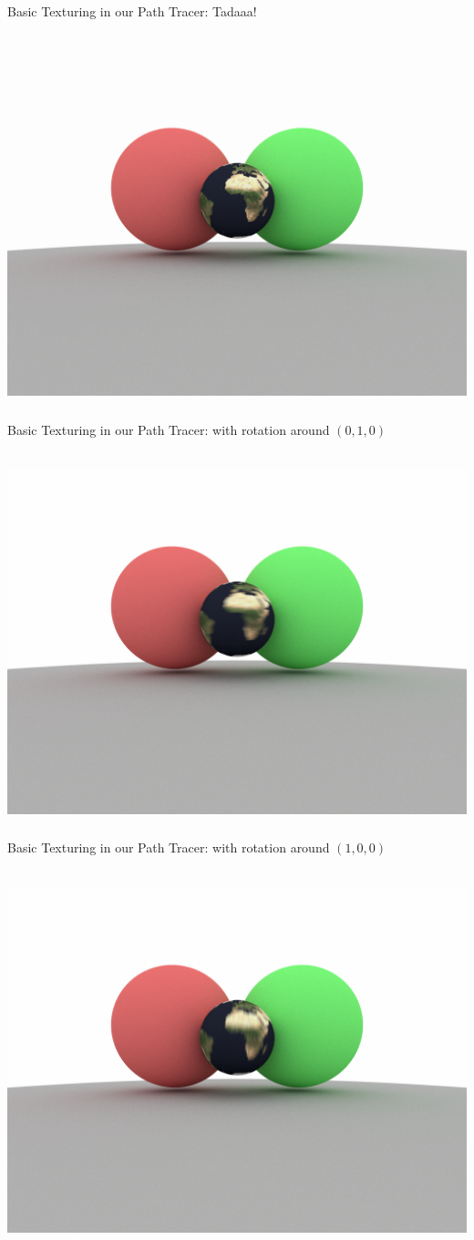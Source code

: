 \documentclass[utf8,stillsansserifmath,fleqn,t]{beamer}
\begin{document}
\begin{frame}[label=basic-tex-3]
\frametitle{\insertsection}
Basic Texturing in our Path Tracer: Tadaaa!\\~\\
\centerline{\includegraphics[width=.7\textwidth]{./fig/pathtracer-result-03.png}}
\end{frame}

\begin{frame}
\frametitle{\insertsection}
Basic Texturing in our Path Tracer:  with rotation around $(0,1,0)$\\~\\
\centerline{\includegraphics[width=.7\textwidth]{./fig/pathtracer-result-03-1.png}}
\end{frame}

\begin{frame}
\frametitle{\insertsection}
Basic Texturing in our Path Tracer:  with rotation around $(1,0,0)$\\~\\
\centerline{\includegraphics[width=.7\textwidth]{./fig/pathtracer-result-03-2.png}}
\end{frame}
\end{document}
